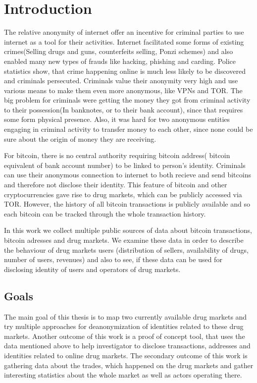 \documentclass[
  digital, %
  table,   %
  lof,     %
  lot,     %
  oneside
]{fithesis3}
\begin{document}
\chapter{Introduction}

The relative anonymity of internet offer an incentive for criminal parties to use internet as a tool for their activities.
Internet facilitated some forms of existing crimes(Selling drugs and guns, counterfeits selling, Ponzi schemes) and also enabled many new types of frauds like hacking, phishing and carding.
Police statistics show, that crime happening online is much less likely to be discovered and criminals persecuted. Criminals value their anonymity very high and use various means to make them even more anonymous,
like VPNs and TOR. The big problem for criminals were getting the money they got from criminal activity to their possession(In banknotes, or to their bank account), since that requires some form physical presence.
Also, it was hard for two anonymous entities engaging in criminal activity to transfer money to each other, since none could be sure about the origin of money they are receiving.

For bitcoin, there is no central authority requiring bitcoin address( bitcoin equivalent of bank account number) to be linked to person's identity.
Criminals can use their anonymous connection to internet to both recieve and send bitcoins and therefore not disclose their identity.
This feature of bitcoin and other cryptocurrencies gave rise to drug markets, which can be publicly accessed via TOR. However,
the history of all bitcoin transactions is publicly available and so each bitcoin can be tracked through the whole transaction history.

In this work we collect multiple public sources of data about bitcoin transactions, bitcoin adresses and drug markets.
We examine these data in order to describe the behaviour of drug markets users (distribution of sellers, availability of drugs,
number of users, revenues) and also to see, if these data can be used for disclosing identity of users and operators of drug markets.

\section{Goals}

The main goal of this thesis is to map two currently available drug markets 
and try multiple approaches for deanonymization of identities related to these drug markets.
Another outcome of this work is a proof of concept tool, that uses the data mentioned above to help investigator to disclose transactions,
addresses and identities related to online drug markets.
The secondary outcome of this work is gathering data about the trades, which happened on the drug markets and
 gather interesting statistics about the whole market as well as actors operating there.
\end{document}
